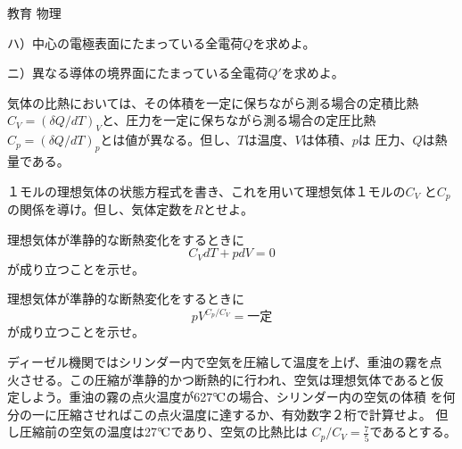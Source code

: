 \documentclass[fleqn]{jbook}
\begin{document}
\begin{question}{教育 物理}{}
\begin{subquestions}
\begin{subsubquestions}
ハ）中心の電極表面にたまっている全電荷$Q$を求めよ。

ニ）異なる導体の境界面にたまっている全電荷$Q'$を求めよ。

\end{subsubquestions}

\SubQuestion

気体の比熱においては、その体積を一定に保ちながら測る場合の定積比熱
$C_V=(\delta Q/dT)_V$と、圧力を一定に保ちながら測る場合の定圧比熱
$C_p=(\delta Q/dT)_p$とは値が異なる。但し、$T$は温度、$V$は体積、$p$は
圧力、$Q$は熱量である。

\begin{subsubquestions}
\SubSubQuestion
１モルの理想気体の状態方程式を書き、これを用いて理想気体１モルの$C_V$
と$C_p$の関係を導け。但し、気体定数を$R$とせよ。

\SubSubQuestion
理想気体が準静的な断熱変化をするときに
\[ C_V dT+p dV=0 \]
が成り立つことを示せ。

\SubSubQuestion
理想気体が準静的な断熱変化をするときに
\[ pV^{C_p/C_V}= 一定 \]
が成り立つことを示せ。

\SubSubQuestion
ディーゼル機関ではシリンダー内で空気を圧縮して温度を上げ、重油の霧を点
火させる。この圧縮が準静的かつ断熱的に行われ、空気は理想気体であると仮
定しよう。重油の霧の点火温度が627$^{\circ}\!\rm C$の場合、シリンダー内の空気の体積
を何分の一に圧縮させればこの点火温度に達するか、有効数字２桁で計算せよ。
但し圧縮前の空気の温度は27$^{\circ}\!\rm C$であり、空気の比熱比は
$C_p/C_V=\frac{7}{5}$であるとする。

\end{subsubquestions}
\end{subquestions}
\end{question}
\end{document}
